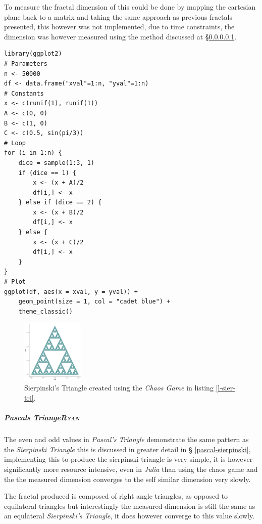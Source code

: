 \documentclass[a4paper,11pt,twoside]{article}
\begin{document}
To measure the fractal dimension of this could be done by mapping the cartesian
plane back to a matrix and taking the same approach as previous fractals
presented, this however was not implemented, due to time constraints, the
dimension was however measured using the method discussed at \S \ref{pas-tri}.

\begin{listing}[htbp]
\begin{verbatim}
library(ggplot2)
# Parameters
n <- 50000
df <- data.frame("xval"=1:n, "yval"=1:n)
# Constants
x <- c(runif(1), runif(1))
A <- c(0, 0)
B <- c(1, 0)
C <- c(0.5, sin(pi/3))
# Loop
for (i in 1:n) {
    dice = sample(1:3, 1)
    if (dice == 1) {
        x <- (x + A)/2
        df[i,] <- x
    } else if (dice == 2) {
        x <- (x + B)/2
        df[i,] <- x
    } else {
        x <- (x + C)/2
        df[i,] <- x
    }
}
# Plot
ggplot(df, aes(x = xval, y = yval)) +
    geom_point(size = 1, col = "cadet blue") +
    theme_classic()

\end{verbatim}
\caption{\label{l-sier-tri}R code to construct Sierpinksi's triangle through the Choas Game, shown in figure \ref{fig:s-tri}.}
\end{listing}

\begin{figure}
\centering
\includegraphics[width=3cm]{pascal-sierpinsky-chaos-game.png}
\caption{\label{fig:s-tri}Sierpinski's Triangle created using the \emph{Chaos Game} in listing \ref{l-sier-tri}.}
\end{figure}

\subparagraph{Pascals Triange\hfill{}\textsc{Ryan}}
\label{pas-tri}
The even and odd values in \emph{Pascal's Triangle} demonstrate the same pattern as
the \emph{Sierpinski Triangle} this is discussed in greater detail in \S
\ref{pascal-sierpinski}, implementing this to produce the sierpinski triangle is very
simple, it is however significantly more resource intensive, even in \emph{Julia}
than using the chaos game and the the measured dimension converges to the self
similar dimension very slowly.

The fractal produced is composed of right angle triangles, as opposed to equilateral triangles but interestingly the measured dimension is still the same as an equlateral \emph{Sierpinski's Triangle}, it does however converge to this value slowly.
\end{document}
